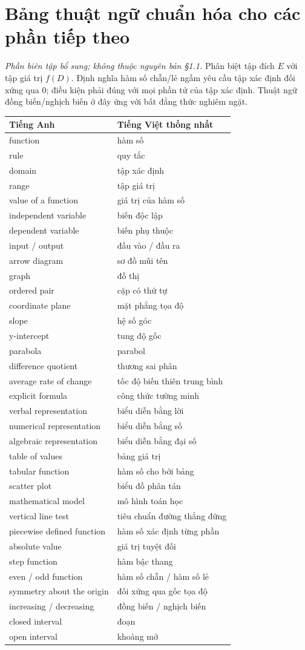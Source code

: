 \documentclass[12pt,a4paper]{article}
\begin{document}
\clearpage
\section*{Bảng thuật ngữ chuẩn hóa cho các phần tiếp theo}
\noindent\textit{Phần biên tập bổ sung; không thuộc nguyên bản §1.1.} Phân biệt tập đích $E$ với tập giá trị $f(D)$. Định nghĩa hàm số chẵn/lẻ ngầm yêu cầu tập xác định đối xứng qua 0; điều kiện phải đúng với mọi phần tử của tập xác định. Thuật ngữ đồng biến/nghịch biến ở đây ứng với bất đẳng thức nghiêm ngặt.
\begin{longtable}{p{.42\linewidth}p{.49\linewidth}}\toprule Tiếng Anh&Tiếng Việt thống nhất\\\midrule\endhead
function&hàm số\\
rule&quy tắc\\
domain&tập xác định\\
range&tập giá trị\\
value of a function&giá trị của hàm số\\
independent variable&biến độc lập\\
dependent variable&biến phụ thuộc\\
input / output&đầu vào / đầu ra\\
arrow diagram&sơ đồ mũi tên\\
graph&đồ thị\\
ordered pair&cặp có thứ tự\\
coordinate plane&mặt phẳng tọa độ\\
slope&hệ số góc\\
y-intercept&tung độ gốc\\
parabola&parabol\\
difference quotient&thương sai phân\\
average rate of change&tốc độ biến thiên trung bình\\
explicit formula&công thức tường minh\\
verbal representation&biểu diễn bằng lời\\
numerical representation&biểu diễn bằng số\\
algebraic representation&biểu diễn bằng đại số\\
table of values&bảng giá trị\\
tabular function&hàm số cho bởi bảng\\
scatter plot&biểu đồ phân tán\\
mathematical model&mô hình toán học\\
vertical line test&tiêu chuẩn đường thẳng đứng\\
piecewise defined function&hàm số xác định từng phần\\
absolute value&giá trị tuyệt đối\\
step function&hàm bậc thang\\
even / odd function&hàm số chẵn / hàm số lẻ\\
symmetry about the origin&đối xứng qua gốc tọa độ\\
increasing / decreasing&đồng biến / nghịch biến\\
closed interval&đoạn\\
open interval&khoảng mở\\
\bottomrule\end{longtable}
\end{document}

